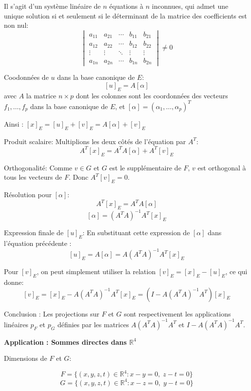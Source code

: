 \documentclass[10pt,a4paper]{article}
\begin{document}
Il s'agit d'un système linéaire de $n$ équations à $n$ inconnues, qui admet une unique solution si
et seulement si le déterminant de la matrice des coefficients est non nul:
\[\begin{vmatrix}
a_{11} & a_{21} & \cdots & b_{11} & b_{21} \\
a_{12} & a_{22} & \cdots & b_{12} & b_{22} \\
\vdots & \vdots & \ddots & \vdots & \vdots \\
a_{1n} & a_{2n} & \cdots & b_{1n} & b_{2n}
\end{vmatrix} \neq 0\]

Coodonnées de \(u\) dans la base canonique de \(E\):
\[[u]_E = A[\alpha]\]
avec \(A\) la matrice \(n \times p\) dont les colonnes sont les coordonnées des vecteurs \(f_1, \ldots, f_p\)
dans la base canonique de \(E\), et \([\alpha] = (\alpha_1, \ldots, \alpha_p)^T\)

Ainsi : \([x]_E = [u]_E + [v]_E = A[\alpha] + [v]_E\)

Produit scalaire: Multiplions les deux côtés de l'équation par \(A^T\):
\[A^T[x]_E = A^T A[\alpha] + A^T[v]_E\]

Orthogonalité: Comme \(v \in G\) et \(G\) est le supplémentaire de \(F\), \(v\) est orthogonal à tous les
vecteurs de \(F\). Donc \(A^T[v]_E = 0\).

Résolution pour \([\alpha]\):
\[A^T[x]_E = A^T A[\alpha]\]
\[[\alpha] = (A^T A)^{-1}A^T[x]_E\]

Expression finale de \([u]_E\): En substituant cette expression de \([\alpha]\) dans l'équation
précédente :
\[ [u]_E = A[\alpha] = A(A^T A)^{-1}A^T[x]_E \]

Pour \([v]_E\), on peut simplement utiliser la relation \([v]_E = [x]_E - [u]_E\), ce qui donne:
\[
[v]_E = [x]_E - A(A^T A)^{-1}A^T[x]_E = (I - A(A^T A)^{-1}A^T)[x]_E
\]

Conclusion : Les projections sur \(F\) et \(G\) sont respectivement les applications linéaires \(p_F\) et
\(p_G\) définies par les matrices \(A(A^T A)^{-1}A^T\) et \(I - A(A^T A)^{-1}A^T\).

\bigskip
\textbf{Application : Sommes directes dans $\mathbb{R}^4$}

\q Dimensions de \(F\) et \(G\):

\[ F = \{ (x, y, z, t) \in \mathbb{R}^4 : x - y = 0, \; z - t = 0 \} \]
\[ G = \{ (x, y, z, t) \in \mathbb{R}^4 : x - z = 0, \; y - t = 0 \} \]
\end{document}
